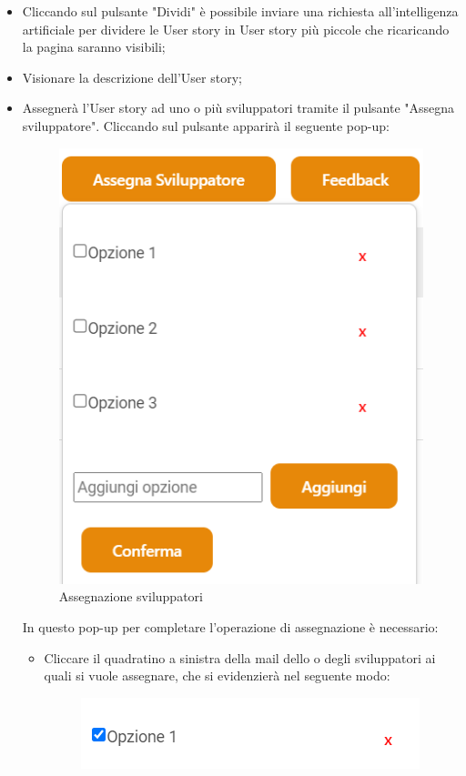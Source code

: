 \documentclass{article}
\begin{document}
\begin{itemize}
    \item Cliccando sul pulsante "Dividi" è possibile inviare una richiesta all'intelligenza artificiale per dividere le User story in User story più piccole che ricaricando la pagina saranno visibili;
    \item Visionare la descrizione dell'User story;
    \item Assegnerà l'User story ad uno o più sviluppatori tramite il pulsante "Assegna sviluppatore". Cliccando sul pulsante apparirà il seguente pop-up:
        \begin{figure}[H]
      \centering
      \includegraphics{documenti/Screenshot manuale utente/assegna sviluppatore.png}
      \caption{Assegnazione sviluppatori}
      \label{assegnadev}
    \end{figure}
    In questo pop-up per completare l'operazione di assegnazione è necessario:
    \begin{itemize}
        \item Cliccare il quadratino a sinistra della mail dello o degli sviluppatori ai quali si vuole assegnare, che si evidenzierà nel seguente modo: 
        \begin{figure}[H]
      \centering
      \includegraphics{documenti/Screenshot manuale utente/selezione sviluppatore.png}

\end{figure}
\end{itemize}
\end{itemize}
\end{document}
